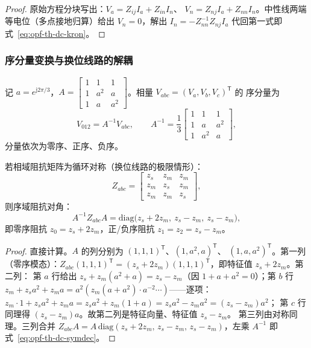 \begin{proof}
原始方程分块写出：$V_a=Z_{ij}I_a+Z_{in}I_n$、
$V_n=Z_{nj}I_a+Z_{nn}I_n$。中性线两端等电位（多点接地归算）给出
$V_n=0$，解出 $I_n=-Z_{nn}^{-1}Z_{nj}I_a$ 代回第一式即
式~\eqref{eq:opf-th-dc-kron}。
\end{proof}

\subsubsection{序分量变换与换位线路的解耦}

\begin{definition}\label{def:opf-th-dc-fortescue}
记 $a=e^{\mathrm j2\pi/3}$，$A=\begin{bmatrix}1&1&1\\ 1&a^2&a\\
1&a&a^2\end{bmatrix}$。相量 $V_{abc}=(V_a,V_b,V_c)^{\mathsf T}$ 的
序分量为~\cite{opfdc:fortescue}
\begin{equation}
V_{012}=A^{-1}V_{abc},\qquad
A^{-1}=\frac13\begin{bmatrix}1&1&1\\ 1&a&a^2\\ 1&a^2&a\end{bmatrix},
\label{eq:opf-th-dc-fortescue}
\end{equation}
分量依次为零序、正序、负序。
\end{definition}

\begin{proposition}[换位线路的序网解耦]\label{prop:opf-th-dc-symdec}
若相域阻抗矩阵为循环对称（换位线路的极限情形）：
\begin{equation}
Z_{abc}=\begin{bmatrix}z_s&z_m&z_m\\ z_m&z_s&z_m\\ z_m&z_m&z_s\end{bmatrix},
\label{eq:opf-th-dc-circ}
\end{equation}
则序域阻抗对角：
\begin{equation}
A^{-1}Z_{abc}A=\mathrm{diag}\bigl(z_s+2z_m,\ z_s-z_m,\ z_s-z_m\bigr),
\label{eq:opf-th-dc-symdec}
\end{equation}
即零序阻抗 $z_0=z_s+2z_m$，正/负序阻抗 $z_1=z_2=z_s-z_m$。
\end{proposition}

\begin{proof}
直接计算。$A$ 的列分别为 $(1,1,1)^{\mathsf T}$、$(1,a^2,a)^{\mathsf T}$、
$(1,a,a^2)^{\mathsf T}$。第一列（零序模态）：$Z_{abc}(1,1,1)^{\mathsf T}
=(z_s+2z_m)(1,1,1)^{\mathsf T}$，即特征值 $z_s+2z_m$。第二列：
第 $a$ 行给出 $z_s+z_m(a^2+a)=z_s-z_m$（因 $1+a+a^2=0$）；第 $b$ 行
$z_m+z_sa^2+z_ma=a^2(z_m(a+a^2)\cdot a^{-2}\cdots)$——逐项：
$z_m\cdot1+z_s a^2+z_m a=z_s a^2+z_m(1+a)=z_sa^2-z_ma^2=(z_s-z_m)a^2$；
第 $c$ 行同理得 $(z_s-z_m)a$。故第二列是特征向量、特征值 $z_s-z_m$。
第三列由对称同理。三列合并 $Z_{abc}A=A\,\mathrm{diag}(z_s+2z_m,\,
z_s-z_m,\,z_s-z_m)$，左乘 $A^{-1}$ 即式~\eqref{eq:opf-th-dc-symdec}。
\end{proof}

